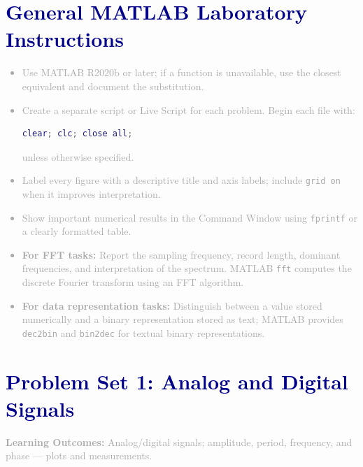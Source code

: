 \documentclass[12pt,a4paper]{article}
\begin{document}
\newpage

\section*{\LARGE\textbf{\textcolor{darkblue}{General MATLAB Laboratory Instructions}}}

\textcolor{darkgray}{
\begin{itemize}
    \item Use MATLAB R2020b or later; if a function is unavailable, use the closest equivalent and document the substitution.
    
    \item Create a separate script or Live Script for each problem. Begin each file with:
    \begin{lstlisting}[language=MATLAB, basicstyle=\ttfamily\small, backgroundcolor=\color{lightgray}]
clear; clc; close all;
    \end{lstlisting}
    unless otherwise specified.
    
    \item Label every figure with a descriptive title and axis labels; include \texttt{grid on} when it improves interpretation.
    
    \item Show important numerical results in the Command Window using \texttt{fprintf} or a clearly formatted table.
    
    \item \textbf{For FFT tasks:} Report the sampling frequency, record length, dominant frequencies, and interpretation of the spectrum. MATLAB \texttt{fft} computes the discrete Fourier transform using an FFT algorithm.
    
    \item \textbf{For data representation tasks:} Distinguish between a value stored numerically and a binary representation stored as text; MATLAB provides \texttt{dec2bin} and \texttt{bin2dec} for textual binary representations.
\end{itemize}
}

\newpage

\section*{\LARGE\textbf{\textcolor{darkblue}{Problem Set 1: Analog and Digital Signals}}}

\textcolor{darkgray}{\textbf{Learning Outcomes:} Analog/digital signals; amplitude, period, frequency, and phase --- plots and measurements.}
\end{document}
